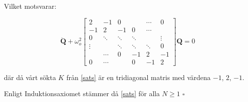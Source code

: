 \documentclass[12pt,a4paper]{article}
\begin{document}
\begin{appendix}
		\newpage
		
		Vilket motsvarar:
		
		\begin{equation*}
			\mathbf{\ddot{Q}} + \omega_o^2 \begin{bmatrix}
				2 & -1 & 0 & & \cdots & 0 \\
				-1 & 2 & -1 & 0 & \cdots & \\
				0 & \ddots & \ddots & \ddots & & \vdots \\
				\vdots &  & \ddots & \ddots & \ddots & 0 \\
				& \cdots & 0 & -1 & 2  & -1 \\
				0 & \cdots & & 0 & -1 & 2
			\end{bmatrix} \mathbf{Q} = 0
		\end{equation*}
		
		där då vårt sökta $K$ från \ref{sats} är en tridiagonal matris med värdena $-1$, $2$, $-1$.
		
		Enligt Induktionsaxiomet stämmer då \ref{sats} för alla $N \geq 1$ \hfill $\square$
		
	\end{appendix}
\end{document}
